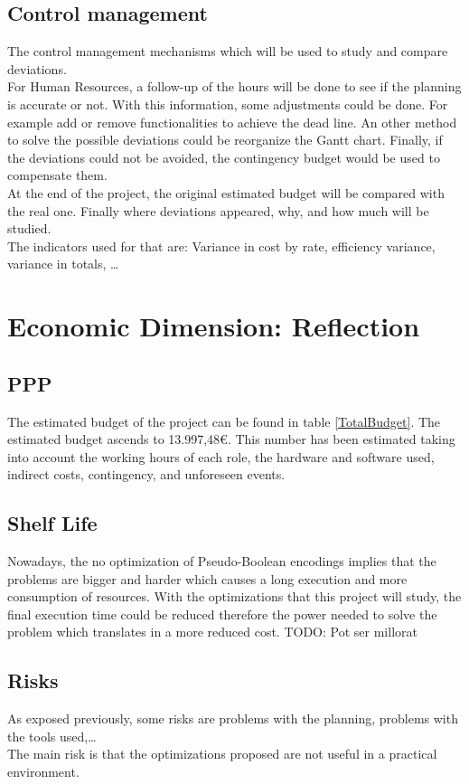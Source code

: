 \subsection{Control management}
The control management mechanisms which will be used to study and compare deviations.\\

For Human Resources, a follow-up of the hours will be done to see if the planning is accurate or not. With this information, some adjustments could be done. For example add or remove functionalities to achieve the dead line. An other method to solve the possible deviations could be reorganize the Gantt chart. Finally, if the deviations could not be avoided, the contingency budget would be used to compensate them.\\

At the end of the project, the original estimated budget will be compared with the real one. Finally where deviations appeared, why, and how much will be studied. \\

The indicators used for that are: Variance in cost by rate, efficiency variance, variance in totals, \ldots

\section{Economic Dimension: Reflection}

\subsection{PPP}
The estimated budget of the project can be found in table \ref{TotalBudget}. The estimated budget ascends to 13.997,48€. This number has been estimated taking into account the working hours of each role, the hardware and software used, indirect costs, contingency, and unforeseen events. 
\subsection{Shelf Life}
Nowadays, the no optimization of Pseudo-Boolean encodings implies that the problems are bigger and harder which causes a long execution and more consumption of resources. With the optimizations that this project will study, the final execution time could be reduced therefore the power needed to solve the problem which translates in a more reduced cost.
TODO: Pot ser millorat

\subsection{Risks}
As exposed previously, some risks are problems with the planning, problems with the tools used,\ldots\\
The main risk is that the optimizations proposed are not useful in a practical environment. 

